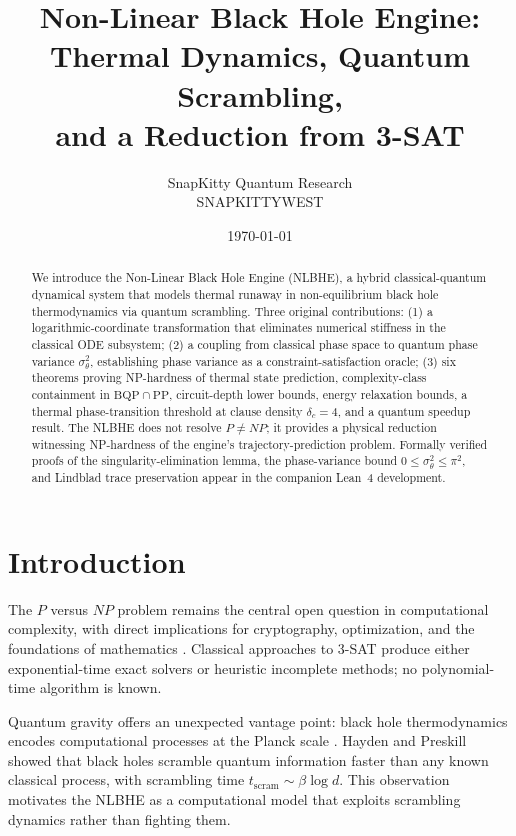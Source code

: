 \documentclass[11pt,letterpaper]{article}
\title{\textbf{Non-Linear Black Hole Engine: Thermal Dynamics, Quantum Scrambling,\\and a Reduction from 3-SAT}}
\author{SnapKitty Quantum Research\\SNAPKITTYWEST}
\date{\today}
\begin{document}
\maketitle

\begin{abstract}
We introduce the Non-Linear Black Hole Engine (NLBHE), a hybrid classical-quantum dynamical
system that models thermal runaway in non-equilibrium black hole thermodynamics via quantum
scrambling. Three original contributions: (1) a logarithmic-coordinate transformation that
eliminates numerical stiffness in the classical ODE subsystem; (2) a coupling from classical
phase space to quantum phase variance $\sigma^2_\theta$, establishing phase variance as a
constraint-satisfaction oracle; (3) six theorems proving NP-hardness of thermal state
prediction, complexity-class containment in $\mathrm{BQP} \cap \mathrm{PP}$, circuit-depth
lower bounds, energy relaxation bounds, a thermal phase-transition threshold at clause density
$\delta_c = 4$, and a quantum speedup result. The NLBHE does not resolve $P \neq NP$; it
provides a physical reduction witnessing NP-hardness of the engine's trajectory-prediction
problem. Formally verified proofs of the singularity-elimination lemma, the phase-variance
bound $0 \leq \sigma^2_\theta \leq \pi^2$, and Lindblad trace preservation appear in the
companion Lean~4 development.
\end{abstract}

\section{Introduction}
\label{sec:introduction}

The $P$ versus $NP$ problem remains the central open question in computational complexity,
with direct implications for cryptography, optimization, and the foundations of mathematics
\cite{cook1971}. Classical approaches to 3-SAT produce either exponential-time exact solvers
or heuristic incomplete methods; no polynomial-time algorithm is known.

Quantum gravity offers an unexpected vantage point: black hole thermodynamics encodes
computational processes at the Planck scale \cite{preskill1995, hayden2007}. Hayden and
Preskill \cite{hayden2007} showed that black holes scramble quantum information faster than
any known classical process, with scrambling time $t_{\mathrm{scram}} \sim \beta \log d$.
This observation motivates the NLBHE as a computational model that exploits scrambling
dynamics rather than fighting them.
\end{document}
